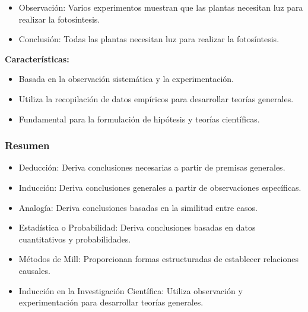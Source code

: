 \begin{itemize}
   \item Observación: Varios experimentos muestran que las plantas necesitan luz para realizar la fotosíntesis.
   \item Conclusión: Todas las plantas necesitan luz para realizar la fotosíntesis.
\end{itemize}

\textbf{Características:}

\begin{itemize}
   \item Basada en la observación sistemática y la experimentación.
   \item Utiliza la recopilación de datos empíricos para desarrollar teorías generales.
   \item Fundamental para la formulación de hipótesis y teorías científicas. 
\end{itemize}

\subsubsection{Resumen}

\begin{itemize}
   \item Deducción: Deriva conclusiones necesarias a partir de premisas generales.
   \item Inducción: Deriva conclusiones generales a partir de observaciones específicas.
   \item Analogía: Deriva conclusiones basadas en la similitud entre casos.
   \item Estadística o Probabilidad: Deriva conclusiones basadas en datos cuantitativos y probabilidades.
   \item Métodos de Mill: Proporcionan formas estructuradas de establecer relaciones causales.
   \item Inducción en la Investigación Científica: Utiliza observación y experimentación para desarrollar teorías generales.
\end{itemize}
